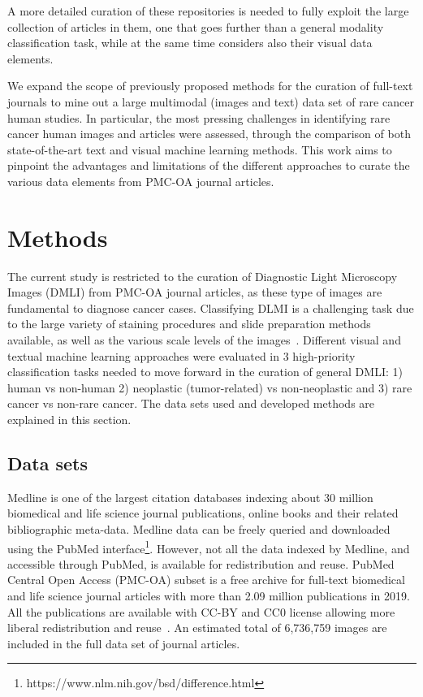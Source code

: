\documentclass[]{spie}  %
\begin{document}
A more detailed curation of these repositories is needed to fully exploit the large collection of articles in them, one that goes further than a general modality classification task, while at the same time considers also their visual data elements.

We expand the scope of previously proposed methods for the curation of full-text journals to mine out a large multimodal (images and text) data set of rare cancer human studies.
In particular, the most pressing challenges in identifying rare cancer human images and articles were assessed, through the comparison of both state-of-the-art text and visual machine learning methods. 
This work aims to pinpoint the advantages and limitations of the different approaches to curate the various data elements from PMC-OA journal articles. 
%
\section{Methods}
\label{sec:methods}
%
The current study is restricted to the curation of Diagnostic Light Microscopy Images (DMLI) from PMC-OA journal articles, as these type of images are fundamental to diagnose cancer cases.
Classifying DLMI is a challenging task due to the large variety of staining procedures and slide preparation methods available, as well as the various scale levels of the images~\cite{OPA2018}. 
Different visual and textual machine learning approaches were evaluated in 3 high-priority classification tasks needed to move forward in the curation of general DMLI: 1) human vs non-human 2) neoplastic (tumor-related) vs non-neoplastic and 3) rare cancer vs non-rare cancer. 
The data sets used and developed methods are explained in this section. 
%
\subsection{Data sets}
\label{subsec:dataset}
%
Medline is one of the largest citation databases indexing about 30 million biomedical and life science journal publications, online books and their related bibliographic meta-data.
Medline data can be freely queried and downloaded using the PubMed interface\footnote{https://www.nlm.nih.gov/bsd/difference.html}.
However, not all the data indexed by Medline, and accessible through PubMed, is available for redistribution and reuse.
PubMed Central Open Access (PMC-OA) subset is a free archive for full-text biomedical and life science journal articles with more than 2.09 million publications in 2019.
All the publications are available with CC-BY and CC0 license allowing more liberal redistribution and reuse~\cite{SAB2019}. 
An estimated total of 6,736,759 images 
are included in the full data set of journal articles.
\end{document}
